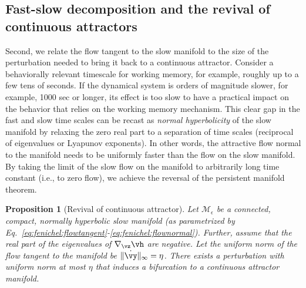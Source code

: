 \documentclass{article} %
\newcounter{ct}
\newcommand{\manifold}{\mathcal{M}}
\newtheorem{prop}{Proposition}
\theoremstyle{definition}
\theoremstyle{remark}
\begin{document}

\subsection{Fast-slow decomposition and the revival of continuous attractors}\label{sec:revival}
Second, we relate the flow tangent to the slow manifold to the size of the perturbation needed to bring it back to a continuous attractor.
Consider a behaviorally relevant timescale for working memory, for example, roughly up to a few tens of seconds.
If the dynamical system is orders of magnitude slower, for example, 1000 sec or longer, its effect is too slow to have a practical impact on the behavior that relies on the working memory mechanism.
This clear gap in the fast and slow time scales can be recast as \emph{normal hyperbolicity} of the slow manifold by relaxing the zero real part to a separation of time scales (reciprocal of eigenvalues or Lyapunov exponents).
In other words, the attractive flow normal to the manifold needs to be uniformly faster than the flow on the slow manifold.
%
By taking the limit of the slow flow on the manifold to arbitrarily long time constant (i.e., to zero flow), we achieve the reversal of the persistent manifold theorem.
\begin{prop}[Revival of continuous attractor]\label{prop:revival}
Let \(\manifold_{\epsilon}\) be a connected, compact, normally hyperbolic slow manifold  (as parametrized by Eq.~\eqref{eq:fenichel:flowtangent}-\eqref{eq:fenichel:flownormal}).
Further, assume that the real part of the eigenvalues of \(\nabla_{\vz} \vh\) are negative. %
Let the uniform norm of the flow tangent to the manifold be \(\|\dot \vy\|_{\infty}=\eta\).
There exists a perturbation with uniform norm at most \(\eta\) that induces a bifurcation to a continuous attractor manifold. %
\end{prop}
\end{document}
